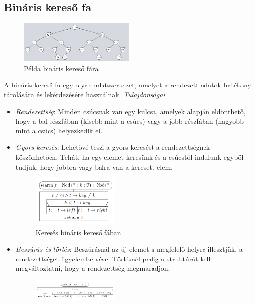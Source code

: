\documentclass[margin=0px]{article}
\begin{document}
\subsection{Bináris kereső fa}
\begin{figure}[H]
    \centering
    \includegraphics[width=0.5\textwidth]{img/bin_sreach_tree_example.png}
    \caption{Példa bináris kereső fára}
\end{figure}
A bináris kereső fa egy olyan adatszerkezet, amelyet a rendezett adatok hatékony tárolására és lekérdezésére használnak.
\textit{Tulajdonságai}
\begin{itemize}
    \item \textit{Rendezettség}: Minden csúcsnak van egy kulcsa, amelyek alapján eldönthető, hogy a bal részfában (kisebb mint a csúcs) vagy a jobb részfában (nagyobb mint a csúcs) helyezkedik el.
    \item \textit{Gyors keresés}: Lehetővé teszi a gyors keresést a rendezettségnek köszönhetően. Tehát, ha egy elemet keresünk és a csúcstól indulunk egyből tudjuk, hogy jobbra vagy balra van a keresett elem.    
        \begin{figure}[H]
            \centering
            \includegraphics[width=0.4\textwidth]{img/search.png}
            \caption{Keresés bináris kereső fában}
        \end{figure}
    \item \textit{Beszúrás és törlés}: Beszúrásnál az új elemet a megfelelő helyre illesztjük, a rendezettséget figyelembe véve. Törlésnél pedig a struktúrát kell megváltoztatni, hogy a rendezettség megmaradjon.
        \begin{figure}[H]
            \centering
            \includegraphics[width=0.4\textwidth]{img/insert.png}

\end{figure}
\end{itemize}
\end{document}
